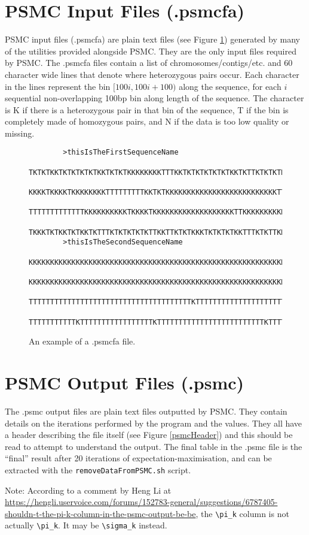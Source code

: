 \documentclass[a4]{article}
\begin{document}
\section{PSMC Input Files (.psmcfa)}
PSMC input files (.psmcfa) are plain text files (see Figure \ref{psmcfa}) generated by many of the utilities provided alongside PSMC. They are the only input files required by PSMC. The .psmcfa files contain a list of chromosomes/contigs/etc. and 60 character wide lines that denote where heterozygous pairs occur. Each character in the lines represent the bin  $[100i,100i+100)$ along the sequence, for each $i$ sequential non-overlapping 100bp bin along length of the sequence. The character is K if there is a heterozygous pair in that bin of the sequence, T if the bin is completely made of homozygous pairs, and N if the data is too low quality or missing.
	\begin{figure}[h]
		\begin{lstlisting}
		>thisIsTheFirstSequenceName
		TKTKTKKTKTKTKTKTKKTKTKTKKKKKKKKTTTKKTKTKTKTKTKTKKTKTTKTKTKTK
		KKKKTKKKKTKKKKKKKKTTTTTTTTTKKTKTKKKKKKKKKKKKKKKKKKKKKKKKKKTT
		TTTTTTTTTTTTTKKKKKKKKKKTKKKKTKKKKKKKKKKKKKKKKKKKTTKKKKKKKKKK
		TKKKTKTKKTKTKKTKTTTKTKTKTKTKTTKKTTKTKTKKKTKTKTKTKKTTTKTKTTKK
		>thisIsTheSecondSequenceName
		KKKKKKKKKKKKKKKKKKKKKKKKKKKKKKKKKKKKKKKKKKKKKKKKKKKKKKKKKKKK
		KKKKKKKKKKKKKKKKKKKKKKKKKKKKKKKKKKKKKKKKKKKKKKKKKKKKKKKKKKKK
		TTTTTTTTTTTTTTTTTTTTTTTTTTTTTTTTTTTTTTKTTTTTTTTTTTTTTTTTTTTT
		TTTTTTTTTTTKTTTTTTTTTTTTTTTTTKTTTTTTTTTTTTTTTTTTTTTTTTTKTTTT
		\end{lstlisting}
		\caption{An example of a .psmcfa file.}\label{psmcfa}
	\end{figure}
	
\section{PSMC Output Files (.psmc)}
The .psmc output files are plain text files outputted by PSMC. They contain details on the iterations performed by the program and the values. They all have a header describing the file itself (see Figure \ref{psmcHeader}) and this should be read to attempt to understand the output. The final table in the .psmc file is the ``final'' result after 20 iterations of expectation-maximisation, and can be extracted with the \verb|removeDataFromPSMC.sh| script.

Note: According to a comment by Heng Li at \url{https://hengli.uservoice.com/forums/152783-general/suggestions/6787405-shouldn-t-the-pi-k-column-in-the-psmc-output-be-be}, the \verb|\pi_k| column is not actually \verb|\pi_k|. It may be \verb|\sigma_k| instead.
\end{document}
